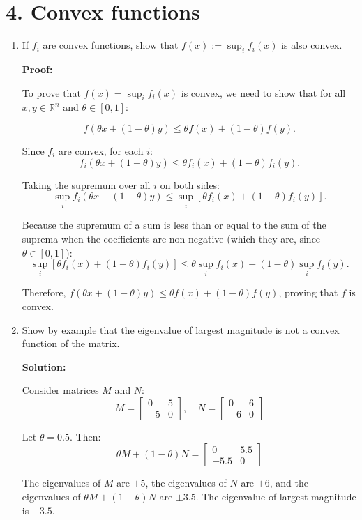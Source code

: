 \documentclass{article}
\begin{document}
\section*{4. Convex functions}
\begin{enumerate}[label=(\alph*)]
\item If $f_i$ are convex functions, show that $f(x) := \sup_i f_i(x)$ is also convex.

\textbf{Proof:}

To prove that $f(x) = \sup_i f_i(x)$ is convex, we need to show that for all $x, y \in \mathbb{R}^n$ and $\theta \in [0,1]$:

\[f(\theta x + (1-\theta) y) \leq \theta f(x) + (1-\theta) f(y).\]

Since $f_i$ are convex, for each $i$:
\[f_i(\theta x + (1-\theta) y) \leq \theta f_i(x) + (1-\theta) f_i(y).\]

Taking the supremum over all $i$ on both sides:
\[\sup_i f_i(\theta x + (1-\theta) y) \leq \sup_i [\theta f_i(x) + (1-\theta) f_i(y)].\]

Because the supremum of a sum is less than or equal to the sum of the suprema when the coefficients are non-negative (which they are, since $\theta \in [0,1]$):
\[\sup_i [\theta f_i(x) + (1-\theta) f_i(y)] \leq \theta \sup_i f_i(x) + (1-\theta) \sup_i f_i(y).\]

Therefore, $f(\theta x + (1-\theta) y) \leq \theta f(x) + (1-\theta) f(y)$, proving that $f$ is convex.

\item Show by example that the eigenvalue of largest magnitude is not a convex function of the matrix.

\textbf{Solution:}

Consider matrices $M$ and $N$:
\[M = \begin{bmatrix} 0 & 5 \\ -5 & 0 \end{bmatrix}, \quad N = \begin{bmatrix} 0 & 6 \\ -6 & 0 \end{bmatrix}\]

Let $\theta = 0.5$. Then:
\[\theta M + (1-\theta)N = \begin{bmatrix} 0 & 5.5 \\ -5.5 & 0 \end{bmatrix}\]

The eigenvalues of $M$ are $\pm 5$, the eigenvalues of $N$ are $\pm 6$, and the eigenvalues of $\theta M + (1-\theta)N$ are $\pm 3.5$. The eigenvalue of largest magnitude is $-3.5$.


\end{enumerate}
\end{document}
